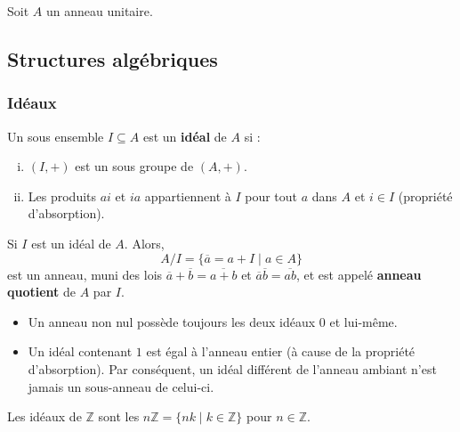 



	
	Soit $A$ un anneau unitaire.

	\subsection{Structures algébriques}
	
	\subsubsection{Idéaux}
	
	
	\begin{definition}
		Un sous ensemble $I \subseteq A$ est un \textbf{idéal} de $A$ si :
		\begin{enumerate}[(i)]
			\item $(I,+)$ est un sous groupe de $(A,+)$.
			\item Les produits $ai$ et $ia$ appartiennent à $I$ pour tout $a$ dans $A$ et $i \in I$ (propriété d'absorption).
		\end{enumerate}
		Si $I$ est un idéal de $A$. Alors,
		\[ A/I = \{ \overline{a} = a + I \mid a \in A \} \]
		est un anneau, muni des lois $\overline{a} + \overline{b} = \overline{a+b}$ et $\overline{a} \overline{b} = \overline{ab}$, et est appelé \textbf{anneau quotient} de $A$ par $I$.
	\end{definition}
	
	
	\begin{remark}
		\begin{itemize}
			\item Un anneau non nul possède toujours les deux idéaux ${0}$ et lui-même.
			\item Un idéal contenant $1$ est égal à l'anneau entier (à cause de la propriété d'absorption). Par conséquent, un idéal différent de l'anneau ambiant n'est jamais un sous-anneau de celui-ci.
		\end{itemize}
	\end{remark}
	
	\begin{example}
		\label{122-1}
		Les idéaux de $\mathbb{Z}$ sont les $n\mathbb{Z} = \{ nk \mid k \in \mathbb{Z} \}$ pour $n \in \mathbb{Z}$.
	\end{example}
	
